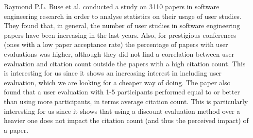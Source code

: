Raymond P.L. Buse et al. \cite{UserEvalPapers} conducted a study on 3110 papers in software engineering research in order to analyse statistics on their usage of user studies.
They found that, in general, the number of user studies in software engineering papers have been increasing in the last years.
Also, for prestigious conferences (ones with a low paper acceptance rate) the percentage of papers with user evaluations was higher, although they did not find a correlation between user evaluation and citation count outside the papers with a high citation count.
This is interesting for us since it shows an increasing interest in including user evaluation, which we are looking for a cheaper way of doing.
The paper also found that a user evaluation with 1-5 participants performed equal to or better than using more participants, in terms average citation count.
This is particularly interesting for us since it shows that using a discount evaluation method over a heavier one does not impact the citation count (and thus the perceived impact) of a paper.